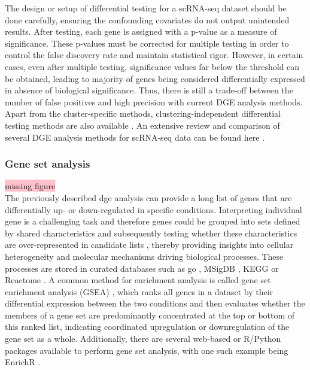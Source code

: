 The design or setup of differential testing for a scRNA-seq dataset should be done carefully, ensuring the confounding covariates do not output unintended results. After testing, each gene is assigned with a p-value as a measure of significance. These p-values must be corrected for multiple testing in order to control the false discovery rate and maintain statistical rigor. However, in certain cases, even after multiple testing, significance values far below the threshold can be obtained, leading to majority of genes being considered differentially expressed in absence of biological significance. Thus, there is still a trade-off between the number of false positives and high precision with current DGE analysis methods. Apart from the cluster-specific methods, clustering-independent differential testing methods are also available \textbf{\cite{vandenbon_clustering-independent_2020,kim_marcopolo_2022,vlot_cluster-independent_2022}}. An extensive review and comparison of several DGE analysis methods for scRNA-seq data can be found here \textbf{\cite{das_comprehensive_2021,squair_confronting_2021,wang_comparative_2019,das_differential_2022,nguyen_benchmarking_2023}}.

\subsubsection{Gene set analysis}
\colorbox{pink}{missing figure}\\
The previously described \gls{dge} analysis can provide a long list of genes that are differentially up- or down-regulated in specific conditions. Interpreting individual gene is a challenging task and therefore genes could be grouped into sets defined by shared characteristics and subsequently testing whether these characteristics are over-represented in candidate lists \textbf{\cite{lueckenmalte_d_current_2019}}, thereby providing insights into cellular heterogeneity and molecular mechanisms driving biological processes. These processes are stored in curated databases such as \gls{go} \textbf{\cite{ashburner_gene_2000}}, MSigDB \textbf{\cite{subramanian_gene_2005,liberzon_molecular_2011,castanza_extending_2023}}, KEGG \textbf{\cite{kanehisa_kegg_2017}} or Reactome \textbf{\cite{gillespie_reactome_2022}}. A common method for enrichment analysis is called gene set enrichment analysis (GSEA) \textbf{\cite{heumos_best_2023,subramanian_gene_2005,korotkevich_fast_2021}}, which ranks all genes in a dataset by their differential expression between the two conditions and then evaluates whether the members of a gene set are predominantly concentrated at the top or bottom of this ranked list, indicating coordinated upregulation or downregulation of the gene set as a whole. Additionally, there are several web-based or R/Python packages available to perform gene set analysis, with one such example being EnrichR \textbf{\cite{chen_enrichr_2013,kuleshov_enrichr_2016}}. 



